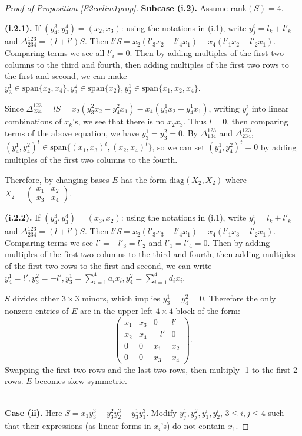 \documentclass[10pt]{article} %
\theoremstyle{definition}
\begin{document}
\begin{proof}[Proof of Proposition \ref{E2codim1prop}]
\textbf{Subcase (i.2).} Assume rank$(S)=4$.

\textbf{(i.2.1).} If $(y^3_4,y^4_3)=(x_2,x_3)$: using the notations in (i.1), write $y^i_j=l_k+l'_k$ and $\Delta^{123}_{234}=(l+l')S$. Then $l'S=x_2(l'_3x_2-l'_4x_1)-x_4(l'_1x_2-l'_2x_1)$. Comparing terms we see all $l'_i=0$. Then by adding multiples of the first two columns to the third and fourth, then adding multiples of the first two rows to the first and second, we can make $y^1_3\in\mathrm{span}\{x_2,x_4\},y^2_3\in\mathrm{span}\{x_2\},y^1_3\in\mathrm{span}\{x_1,x_2,x_4\}$.

Since $\Delta^{123}_{234}=lS=x_2(y^2_3x_2-y^2_4x_1)-x_4(y^1_3x_2-y^1_4x_1)$, writing $y^i_j$ into linear combinations of $x_k$'s, we see that there is no $x_2x_3$. Thus $l=0$, then comparing terms of the above equation, we have $y^1_3=y^2_3=0$. By $\Delta^{123}_{134}$ and $\Delta^{123}_{234}$, $(y^1_4,y^2_4)^t\in\mathrm{span}\{(x_1,x_3)^t,(x_2,x_4)^t\}$, so we can set $(y^1_4,y^2_4)^t=0$ by adding multiples of the first two columns to the fourth.

Therefore, by changing bases $E$ has the form $\mathrm{diag}(X_2,X_2)$ where 
$X_2=\begin{pmatrix}
x_1 & x_2\\
x_3 & x_4
\end{pmatrix}$.

\textbf{(i.2.2).} If $(y^3_4,y^4_3)=(x_3,x_2)$: using the notations in (i.1), write $y^i_j=l_k+l'_k$ and $\Delta^{123}_{234}=(l+l')S$. Then $l'S=x_2(l'_3x_3-l'_4x_1)-x_4(l'_1x_3-l'_2x_1)$. Comparing terms we see $l'=-l'_3=l'_2$ and $l'_1=l'_4=0$. Then by adding multiples of the first two columns to the third and fourth, then adding multiples of the first two rows to the first and second, we can write $y^1_4=l',y^2_3=-l',y^1_3=\sum_{i=1}^4 a_ix_i,y^2_4=\sum_{i=1}^4 d_ix_i$.

$S$ divides other $3\times 3$ minors, which implies $y^1_3=y^2_4=0$. Therefore the only nonzero entries of $E$ are in the upper left $4\times4$ block of the form:
$$\begin{pmatrix}
x_1 & x_3 & 0 & l'\\
x_2 & x_4 & -l' & 0\\
0 & 0 & x_1 & x_2\\
0 & 0 & x_3 & x_4
\end{pmatrix}.$$
Swapping the first two rows and the last two rows, then multiply -1 to the first 2 rows. $E$ becomes skew-symmetric.

~\\\textbf{Case (ii).} Here $S=x_1y^3_3-y^2_3y^3_2-y^1_3y^3_1$. Modify $y^1_j,y^2_j,y^i_1,y^i_2$,
$3\leq i,j \leq 4$
such that their expressions (as linear forms in $x_i$'s) do not contain $x_1$.


\end{proof}
\end{document}
